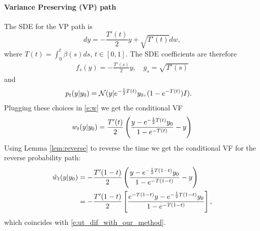 \documentclass{article}
\makeatletter
\renewcommand*{\ie}{{\it i.e.}\@\xspace}
\makeatother
\begin{document}
\paragraph{Variance Preserving (VP) path}
The SDE for the VP path is 
\begin{equation*}
    dy = -\frac{T'(t)}{2}y + \sqrt{T'(t)}dw,
\end{equation*}
where $T(t)=\int_0^t \beta(s)ds$, $t\in [0,1]$. The SDE coefficients are therefore
\begin{align*}
    f_s(y) = -\frac{T'(s)}{2}y, \quad g_s = \sqrt{T'(s)} 
\end{align*}
and
\begin{align*}
    &p_t(y \vert  y_0) = {\mathcal{N}}(y \vert e^{-\frac{1}{2}T(t)}y_0, (1-e^{-T(t)})I).
\end{align*}
Plugging these choices in \eqref{e:w} we get the conditional VF
\begin{equation}
    w_t(y\vert y_0) =\frac{T'(t)}{2}\left (\frac{y-e^{-\frac{1}{2}T(t)}y_0}{1-e^{-T(t)}} -y \right )
\end{equation}
Using Lemma \ref{lem:reverse} to reverse the time we get the conditional VF for the reverse probability path:
\begin{align*}
    \tilde{w}_t(y|y_0) &= -\frac{T'(1-t)}{2}\left (\frac{y-e^{-\frac{1}{2}T(1-t)}y_0}{1-e^{-T(1-t)}} -y \right ) \\
    &= -\frac{T'(1-t)}{2}\left [\frac{e^{-T(1-t)}y-e^{-\frac{1}{2}T(1-t)}y_0}{1-e^{-T(1-t)}}\right ],
\end{align*}
which coincides with \eqref{e:ut_dif_with_our_method}.
\end{document}
